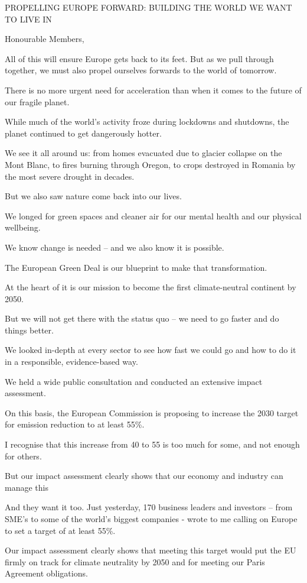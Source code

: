 \documentclass[a4paper,11pt]{article}
\begin{document}
 

PROPELLING EUROPE FORWARD: BUILDING THE WORLD WE WANT TO LIVE IN

Honourable Members,

All of this will ensure Europe gets back to its feet. But as we pull through together, we must also propel ourselves forwards to the world of tomorrow.

There is no more urgent need for acceleration than when it comes to the future of our fragile planet.

While much of the world's activity froze during lockdowns and shutdowns, the planet continued to get dangerously hotter.

We see it all around us: from homes evacuated due to glacier collapse on the Mont Blanc, to fires burning through Oregon, to crops destroyed in Romania by the most severe drought in decades.

But we also saw nature come back into our lives.

We longed for green spaces and cleaner air for our mental health and our physical wellbeing.

We know change is needed – and we also know it is possible.

The European Green Deal is our blueprint to make that transformation.

At the heart of it is our mission to become the first climate-neutral continent by 2050.

But we will not get there with the status quo – we need to go faster and do things better.

We looked in-depth at every sector to see how fast we could go and how to do it in a responsible, evidence-based way.

We held a wide public consultation and conducted an extensive impact assessment.

On this basis, the European Commission is proposing to increase the 2030 target for emission reduction to at least 55\%. 

I recognise that this increase from 40 to 55 is too much for some, and not enough for others.

But our impact assessment clearly shows that our economy and industry can manage this

And they want it too. Just yesterday, 170 business leaders and investors – from SME's to some of the world's biggest companies - wrote to me calling on Europe to set a target of at least 55\%.

Our impact assessment clearly shows that meeting this target would put the EU firmly on track for climate neutrality by 2050 and for meeting our Paris Agreement obligations.
\end{document}
